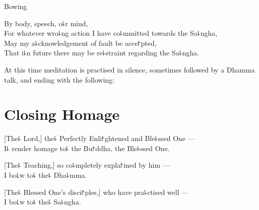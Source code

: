 \begin{instruction}
  Bowing
\end{instruction}

By body, speech, o꜕r mind,\\
For whatever wro꜕ng action I have co꜕mmitted towards the Sa꜕ngha,\\
May my a꜕cknowledgement of fault be acce꜓pted,\\
That i꜕n future there may be re꜕straint regarding the Sa꜕ngha.

\vfill

\begin{instruction}
  At this time meditation is practised in silence, sometimes followed by a Dhamma talk, and ending with the following:
\end{instruction}

\chapter{Closing Homage}%

[The꜕ Lord,] the꜕ Perfectly Enli꜓ghtened and Ble꜕ssed One ---\\
I꜕ render homage to꜕ the Bu꜓ddha, the Ble꜕ssed One. 

[The꜕ Teaching,] so co꜕mpletely expla꜓ined by him ---\\
I bo꜖w to꜕ the꜕ Dha꜕mma. 

[The꜕ Blessed One's disci꜓ples,] who have pra꜕ctised well ---\\
I bo꜖w to꜕ the꜕ Sa꜕ngha. 


